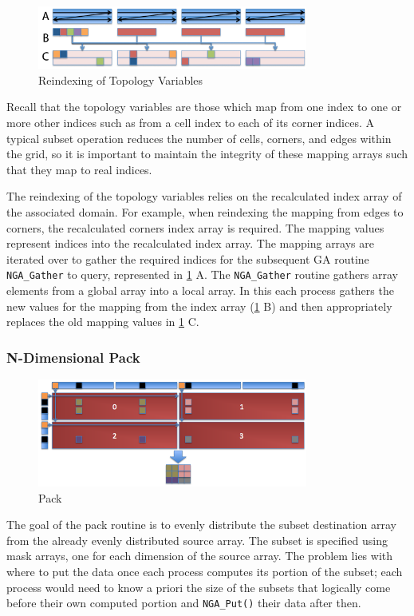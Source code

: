 \begin{figure}[!t]
\center
\includegraphics[width=3.5in]{images/reindex_label}
\caption{Reindexing of Topology Variables}
\label{fig:reindex}
\end{figure}

Recall that the topology variables are those which map from one index to
one or more other indices such as from a cell index to each of its corner
indices.  A typical subset operation reduces the number of cells, corners, and
edges within the grid, so it is important to maintain the integrity of these
mapping arrays such that they map to real indices.

The reindexing of the topology variables relies on the recalculated index
array of the associated domain.  For example, when reindexing the mapping from
edges to corners, the recalculated corners index array is required.  The
mapping values represent indices into the recalculated index array.  The
mapping arrays are iterated over to gather the required indices for the
subsequent GA routine \verb=NGA_Gather= to query, represented in
\ref{fig:reindex} A.  The \verb=NGA_Gather= routine gathers array elements
from a global array into a local array.  In this each process gathers the new
values for the mapping from the index array (\ref{fig:reindex} B) and
then appropriately replaces the old mapping values in \ref{fig:reindex} C.

\subsubsection{N-Dimensional Pack}
\label{section:alg_pack}

\begin{figure}[!t]
\center
\includegraphics[width=3.5in]{images/pack}
\caption{Pack}
\label{fig:pack}
\end{figure}

The goal of the pack routine is to evenly distribute the subset destination
array from the already evenly distributed source array.  The subset is
specified using mask arrays, one for each dimension of the source array.  The
problem lies with where to put the data once each process computes its portion
of the subset; each process would need to know a priori the size of the
subsets that logically come before their own computed portion and
\verb=NGA_Put()= their data after then.

